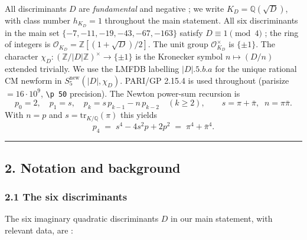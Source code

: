 \documentclass[
  11pt,
  a4paper,
]{amsart}
\begin{document}
All discriminants \(D\) are \emph{fundamental} and negative ; we write \(K_D = \mathbb{Q}(\sqrt D)\), with class number \(h_{K_D} = 1\) throughout the main statement. All six discriminants in the main set \(\{-7, -11, -19, -43, -67, -163\}\) satisfy \(D \equiv 1 \pmod 4\) ; the ring of integers is \(\mathcal{O}_{K_D} = \mathbb{Z}[(1 + \sqrt D)/2]\). The unit group \(\mathcal{O}_{K_D}^\times\) is \(\{\pm 1\}\). The character \(\chi_D : (\mathbb{Z}/|D|\mathbb{Z})^\times \to \{\pm 1\}\) is the Kronecker symbol \(n \mapsto (D/n)\) extended trivially. We use the LMFDB labelling \(|D|.5.b.a\) for the unique rational CM newform in \(S_5^{\mathrm{new}}(|D|, \chi_D)\). PARI/GP 2.15.4 is used throughout (parisize \(= 16 \cdot 10^9\), \texttt{\textbackslash{}p\ 50} precision). The Newton power-sum recursion is
\[
p_0 = 2, \quad p_1 = s, \quad p_k = s\, p_{k-1} - n\, p_{k-2} \quad (k \geq 2), \qquad s = \pi + \bar\pi, \;\; n = \pi\bar\pi.
\]
With \(n = p\) and \(s = \mathrm{tr}_{K/\mathbb{Q}}(\pi)\) this yields
\[
p_4 \;=\; s^4 - 4 s^2 p + 2 p^2 \;=\; \pi^4 + \bar\pi^4.
\]

\begin{center}\rule{0.5\linewidth}{0.5pt}\end{center}

\hypertarget{notation-and-background}{%
\subsection{2. Notation and background}\label{notation-and-background}}

\hypertarget{the-six-discriminants}{%
\subsubsection{2.1 The six discriminants}\label{the-six-discriminants}}

The six imaginary quadratic discriminants \(D\) in our main statement, with relevant data, are :
\end{document}
